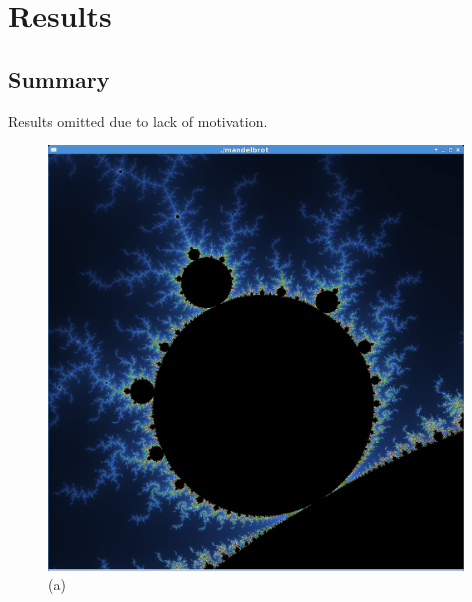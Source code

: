 \chapter{Results}

\section{Summary}

Results omitted due to lack of motivation.

\begin{figure}\centering%
\begin{minipage}{0.5\textwidth}\centering%
\includegraphics[width=0.98\textwidth]{figures/mandelbrot.png}
\\ (a)
\end{minipage}%
\begin{minipage}{0.5\textwidth}\centering%

\end{minipage}
\end{figure}
